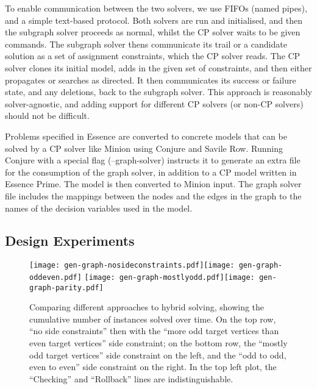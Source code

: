 \documentclass[runningheads]{llncs}
\begin{document}
To enable communication between the two solvers, we use FIFOs (named pipes), and a simple text-based
protocol.  Both solvers are run and initialised, and then the subgraph solver proceeds as normal,
whilst the CP solver waits to be given commands. The subgraph solver thens communicate its trail
or a candidate solution as a set of assignment constraints, which the CP solver reads. The CP solver
clones its initial model, adds in the given set of constraints, and then either propagates or
searches as directed. It then communicates its success or failure state, and any deletions, back to
the subgraph solver. This approach is reasonably solver-agnostic, and adding support for different
CP solvers (or non-CP solvers) should not be difficult.

Problems specified in Essence are converted to concrete models that can be solved by a CP solver like Minion using Conjure and Savile Row.
Running Conjure with a special flag (--graph-solver) instructs it to generate an extra file for the consumption of the graph solver, in addition to a CP model written in Essence Prime.
The model is then converted to Minion input. The graph solver file includes the mappings between the nodes and the edges in the graph to the names of the decision variables used in the model. 

\subsection{Design Experiments}

\begin{figure}[p]
    \texttt{[image: gen-graph-nosideconstraints.pdf]}\hfill\texttt{[image: gen-graph-oddeven.pdf]}
    \bigskip
    \texttt{[image: gen-graph-mostlyodd.pdf]}\hfill\texttt{[image: gen-graph-parity.pdf]}
    \caption{Comparing different approaches to hybrid solving, showing the cumulative number of
    instances solved over time. On the top row, ``no side constraints'' then with the ``more odd
    target vertices than even target vertices'' side constraint; on the bottom row, the ``mostly odd
    target vertices'' side constraint on the left, and the ``odd to odd, even to even'' side
    constraint on the right. In the top left plot, the ``Checking'' and ``Rollback'' lines are
    indistinguishable.}\label{figure:cumulative}
\end{figure}
\end{document}
